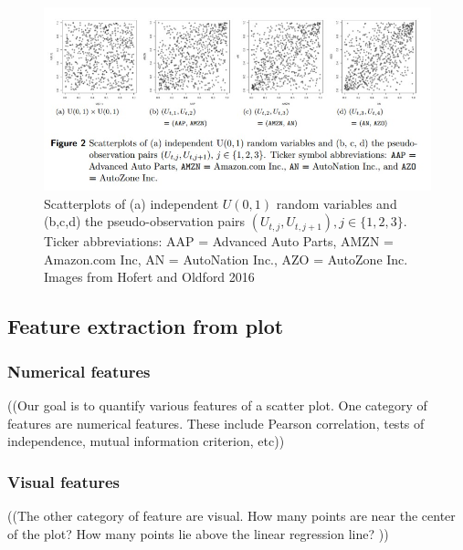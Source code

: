 \begin{figure}[htb]
	\begin{center}
		\includegraphics[width=0.75\linewidth]{ch-visualizer/figures/hofertoldford}
		\caption[Scatterplots of independent $U(0,1)$ random variables and the pseudo-observation pairs $(U_{t,j},U_{t,j+1}),j\in \{1,2,3\}$.]{Scatterplots of (a) independent $U(0,1)$ random variables and (b,c,d) the pseudo-observation pairs $(U_{t,j},U_{t,j+1}),j\in \{1,2,3\}$. Ticker abbreviations: AAP = Advanced Auto Parts, AMZN = Amazon.com Inc, AN = AutoNation Inc., AZO = AutoZone Inc. Images from Hofert and Oldford 2016~\cite{hofert2016}}
		\label{fig:visualizer:hofertoldford}
	\end{center}
\end{figure}

\subsection{Feature extraction from plot}
\label{sec:visualizer:features}

\subsubsection{Numerical features}

((Our goal is to quantify various features of a scatter plot. One category of features are numerical features. These include Pearson correlation, tests of independence, mutual information criterion, etc))

\subsubsection{Visual features}

((The other category of feature are visual. How many points are near the center of the plot? How many points lie above the linear regression line? ))

